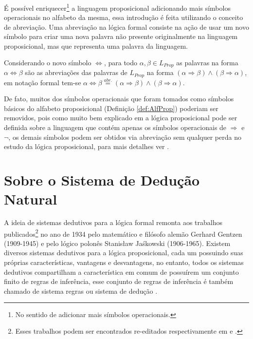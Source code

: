 É possível enriquecer\footnote{No sentido de adicionar mais símbolos operacionais.} a linguagem proposicional adicionando mais símbolos operacionais no alfabeto da mesma, essa introdução é feita utilizando o conceito de abreviação. Uma abreviação na lógica formal consiste na ação de usar um novo símbolo para criar uma nova palavra não presente originalmente na linguagem proposicional, mas que representa uma palavra da linguagem.

\begin{definition}\label{def:SeSomenteSeAbreviatura}
	Considerando o novo símbolo $\Leftrightarrow$, para todo $\alpha, \beta \in L_{Prop}$ as palavras na forma $\alpha \Leftrightarrow \beta$ são as abreviações das palavras de $L_{Prop}$ na forma $(\alpha \Rightarrow \beta) \land (\beta \Rightarrow \alpha)$, em notação formal tem-se $\alpha \Leftrightarrow \beta \stackrel{abr.}{=} (\alpha \Rightarrow \beta) \land (\beta \Rightarrow \alpha)$.
\end{definition}

De fato, muitos dos símbolos operacionais que foram tomados como símbolos básicos do alfabeto proposicional (Definição \ref{def:AlfProp}) poderiam ser removidos, pois como muito bem explicado em \cite{BenjaV1, joaoPavao2014} a lógica proposicional pode ser definida sobre a linguagem que contém apenas os símbolos operacionais de $\Rightarrow$ e $\neg$, os demais símbolos podem ser obtidos via abreviação sem qualquer perda no estudo da lógica proposicional, para mais detalhes ver \cite{BenjaV1}.

\section{Sobre o Sistema de Dedução Natural}\label{sec:SistemaDedutivo}

A ideia de sistemas dedutivos para a lógica formal remonta aos trabalhos publicados\footnote{Esses trabalhos podem ser encontrados re-editados respectivamente em \cite{gentzen1969} e \cite{jaskowski1934}.} no ano de 1934 pelo matemático e filósofo alemão Gerhard Gentzen (1909-1945) e pelo lógico polonês Stanisław Jaśkowski (1906-1965). Existem diversos sistemas dedutivos para a lógica proposicional, cada um possuindo suas próprias características, vantagens e desvantagens, no entanto, todos os sistemas dedutivos compartilham a característica em comum de possuírem um conjunto finito de regras de inferência, esse conjunto de regras de inferência é também chamado de sistema regras ou sistema de dedução \cite{edgar2002}.

